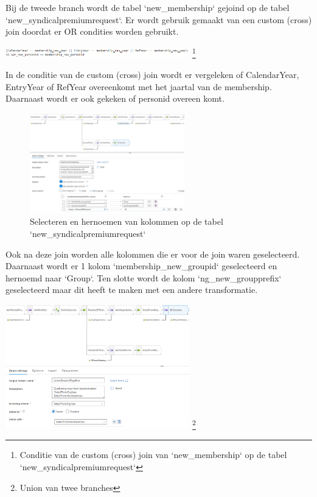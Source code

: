Bij de tweede branch wordt de tabel `new\_membership` gejoind op de tabel `new\_syndicalpremiumrequest`. Er wordt gebruik gemaakt van een custom (cross) join doordat er OR condities worden gebruikt. 

\begin{center}
    \includegraphics[width=0.6\textwidth]{./graphics/adf/bepalen_groep_7.png}
    \footnote{Conditie van de custom (cross) join van `new\_membership` op de tabel `new\_syndicalpremiumrequest`}
\end{center}

In de conditie van de custom (cross) join wordt er vergeleken of CalendarYear, EntryYear of RefYear overeenkomt met het jaartal van de membership. Daarnaast wordt er ook gekeken of personid overeen komt.

\begin{figure}[H]
    \centering
    \includegraphics[width=0.6\textwidth]{./graphics/adf/bepalen_groep_8.png}
    \caption{Selecteren en hernoemen van kolommen op de tabel `new\_syndicalpremiumrequest`}
    \label{fig:bepalengroep}
\end{figure}

Ook na deze join worden alle kolommen die er voor de join waren geselecteerd. Daarnaast wordt er 1 kolom `membership\_new\_groupid` geselecteerd en hernoemd naar `Group`. Ten slotte wordt de kolom `ng\_new\_groupprefix` geselecteerd maar dit heeft te maken met een andere transformatie.

\begin{center}
    \includegraphics[width=0.6\textwidth]{./graphics/adf/bepalen_groep_9.png}
    \footnote{Union van twee branches}
\end{center}

